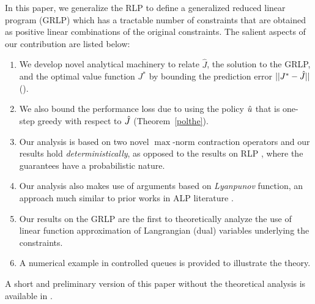 In this paper, we generalize the RLP to define a generalized reduced linear program (GRLP) which has a tractable number of constraints that are obtained as positive linear combinations of the original constraints.
The salient aspects of our contribution are listed below:
\begin{enumerate}
		\item We develop novel analytical machinery to relate $\hat{J}$, the solution to the GRLP, and the optimal value function $J^*$ by bounding the prediction error $||J^*-\hat{J}||$ (). 
		\item We also bound the performance loss due to using the policy $\hat{u}$ that is one-step greedy with respect to $\hat{J}$ (Theorem~\ref{polthe}).
		\item Our analysis is based on two novel $\max$-norm contraction operators and our results hold \emph{deterministically}, as opposed to the results on RLP \cite{SALP,CS}, where the guarantees have a probabilistic nature.
    \item Our analysis also makes use of arguments based on \emph{Lyanpunov} function, an approach much similar to prior works in ALP literature \cite{ALP,SALP}.
		\item Our results on the GRLP are the first to theoretically analyze the use of linear function approximation of Langrangian (dual) variables underlying the constraints.
		\item A numerical example in controlled queues is provided to illustrate the theory.
\end{enumerate}
A short and preliminary version of this paper without the theoretical analysis is available in \cite{aaaipaper}.

